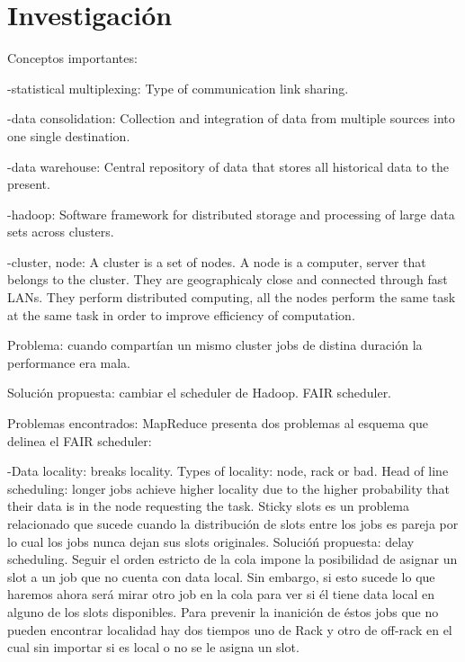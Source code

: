 \section{Investigación}

Conceptos importantes:

-statistical multiplexing: Type of communication link sharing.

-data consolidation: Collection and integration of data from multiple sources
into one single destination.

-data warehouse: Central repository of data that stores all historical data to the
present.

-hadoop: Software framework for distributed storage and processing of large data sets across clusters.

-cluster, node: A cluster is a set of nodes. A node is a computer, server that belongs to the cluster.
They are geographicaly close and connected through fast LANs. They perform distributed computing, all
the nodes perform the same task at the same task in order to improve efficiency of computation.


Problema: cuando compartían un mismo cluster jobs de distina duración la performance era mala.

Solución propuesta: cambiar el scheduler de Hadoop. FAIR scheduler.

Problemas encontrados: MapReduce presenta dos problemas al esquema que delinea
el FAIR scheduler:

-Data locality: breaks locality. Types of locality: node, rack or bad.
Head of line scheduling: longer jobs achieve higher locality due to the higher probability
that their data is in the node requesting the task. Sticky slots es un problema
relacionado que sucede cuando la distribución de slots entre los jobs es pareja por lo cual
los jobs nunca dejan sus slots originales.
Solucióń propuesta: delay scheduling. Seguir el orden estricto de la cola impone la
posibilidad de asignar un slot a un job que no cuenta con data local. Sin embargo, si
esto sucede lo que haremos ahora será mirar otro job en la cola para ver si él tiene
data local en alguno de los slots disponibles. Para prevenir la inanición de éstos jobs que
no pueden encontrar localidad hay dos tiempos uno de Rack y otro de off-rack en el cual sin
importar si es local o no se le asigna un slot.

